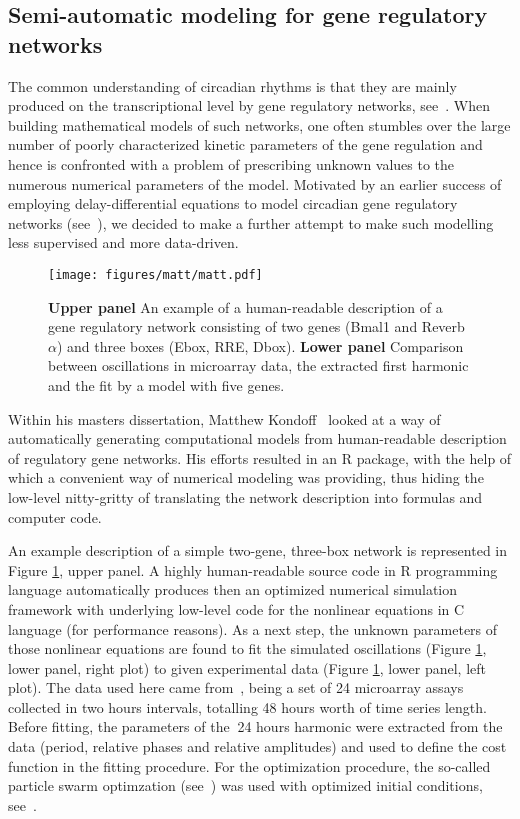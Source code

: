\subsection{Semi-automatic modeling for gene regulatory networks} The
common understanding of circadian rhythms is that they are mainly
produced on the transcriptional level by gene regulatory networks,
see~\cite{reppert2002coordination}. When building mathematical models
of such networks, one often stumbles over the large number of poorly
characterized kinetic parameters of the gene regulation and hence is
confronted with a problem of prescribing unknown values to the
numerous numerical parameters of the model. Motivated by an earlier
success of employing delay-differential equations to model circadian
gene regulatory networks (see~\cite{korencic2012interplay}), we
decided to make a further attempt to make such modelling less
supervised and more data-driven.


\begin{figure}
\begin{center}
\texttt{[image: figures/matt/matt.pdf]}
\end{center}
\caption{
  {\bf Upper panel} An example of a human-readable description of a
  gene regulatory network consisting of two genes (Bmal1 and
  Reverb$\alpha$) and three boxes (Ebox, RRE, Dbox).
  {\bf Lower panel} Comparison between oscillations in microarray
  data, the extracted first harmonic and the fit by a model with five
  genes.
\label{fig::matt}
}
\end{figure}

Within his masters dissertation, Matthew
Kondoff~\cite{kondoff2015modeling} looked at a way of automatically
generating computational models from human-readable description of
regulatory gene networks. His efforts resulted in an R package, with
the help of which a convenient way of numerical modeling was
providing, thus hiding the low-level nitty-gritty of translating the
network description into formulas and computer code.


An example description of a simple two-gene, three-box network is
represented in Figure \ref{fig::matt}, upper panel. A highly
human-readable source code in R programming language automatically
produces then an optimized numerical simulation framework with
underlying low-level code for the nonlinear equations in C language
(for performance reasons). As a next step, the unknown parameters of
those nonlinear equations are found to fit the simulated oscillations
(Figure \ref{fig::matt}, lower panel, right plot) to given
experimental data (Figure \ref{fig::matt}, lower panel, left plot).
The data used here came from~\cite{zhang2014circadian}, being a set of
24 microarray assays collected in two hours intervals, totalling 48
hours worth of time series length. Before fitting, the parameters of
the $~$24 hours harmonic were extracted from the data (period,
relative phases and relative amplitudes) and used to define the cost
function in the fitting procedure. For the optimization procedure, the
so-called particle swarm optimzation (see~\cite{zambrano2012hydropso})
was used with optimized initial conditions,
see~\cite{richards2004choosing}.
